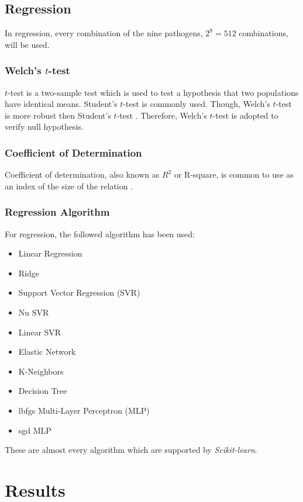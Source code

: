 \documentclass[11pt, a4paper]{article}
\begin{document}
		\subsection{Regression}
			In regression, every combination of the nine pathogens, $2^9 = 512$ combinations, will be used. 
			
			\subsubsection{Welch's $t$-test}
				$t$-test is a two-sample test which is used to test a hypothesis that two populations have identical means. Student's $t$-test is commonly used. Though, Welch's $t$-test is more robust then Student's $t$-test \cite{ref:ttest1}. Therefore, Welch's $t$-test is adopted to verify null hypothesis. 
			
			\subsubsection{Coefficient of Determination}
				Coefficient of determination, also known as $R^2$ or R-square, is common to use as an index of the size of the relation \cite{ref:rsquare1}. 
				
			\subsubsection{Regression Algorithm}
				For regression, the followed algorithm has been used:
				\begin{itemize}
					\item Linear Regression
					\item Ridge
					\item Support Vector Regression (SVR)
					\item Nu SVR
					\item Linear SVR
					\item Elastic Network
					\item K-Neighbors
					\item Decision Tree
					\item lbfgs Multi-Layer Perceptron (MLP)
					\item sgd MLP
				\end{itemize}
				These are almost every algorithm which are supported by \textit{Scikit-learn}.
    
    \section{Results}
\end{document}
